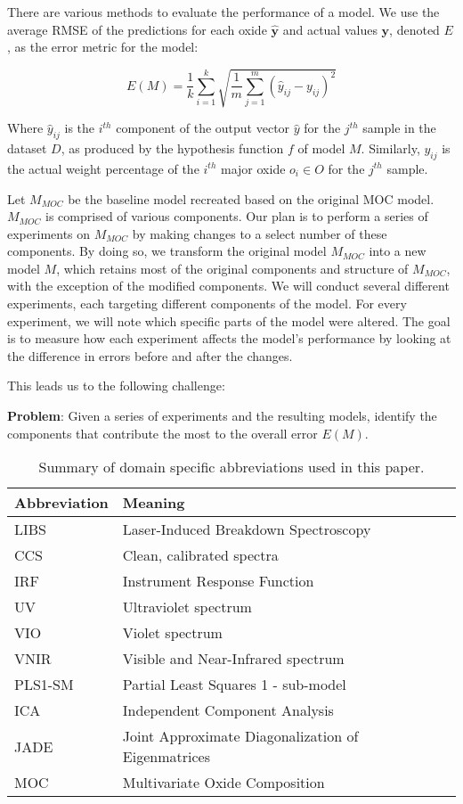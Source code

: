 There are various methods to evaluate the performance of a model.
We use the average RMSE of the predictions for each oxide $\mathbf{\hat{y}}$ and actual values $\mathbf{y}$, denoted $E$, as the error metric for the model:

\begin{equation}\label{eq:avg_rmse_metric}
    E(M) = \frac{1}{k} \sum_{i=1}^{k} \sqrt{\frac{1}{m} \sum_{j=1}^{m} (\hat{y}_{ij} - y_{ij})^2}
\end{equation}

Where \( \hat{y}_{ij} \) is the \( i^{th} \) component of the output vector \( \hat{y} \) for the \( j^{th} \) sample in the dataset \( D \), as produced by the hypothesis function \( f \) of model \( M \). Similarly, \( y_{ij} \) is the actual weight percentage of the \( i^{th} \) major oxide \( o_i \in O \) for the \( j^{th} \) sample.

Let $M_{MOC}$ be the baseline model recreated based on the original MOC model. $M_{MOC}$ is comprised of various components.
Our plan is to perform a series of experiments on $M_{MOC}$ by making changes to a select number of these components.
By doing so, we transform the original model $M_{MOC}$ into a new model $M$, which retains most of the original components and structure of $M_{MOC}$, with the exception of the modified components.
We will conduct several different experiments, each targeting different components of the model.
For every experiment, we will note which specific parts of the model were altered.
The goal is to measure how each experiment affects the model's performance by looking at the difference in errors before and after the changes.

This leads us to the following challenge:

\textbf{Problem}: Given a series of experiments and the resulting models, identify the components that contribute the most to the overall error $E(M)$.

\begin{table}
\centering
\begin{tabularx}{\columnwidth}{lX} %
\toprule
Abbreviation & Meaning \\
\midrule
LIBS & Laser-Induced Breakdown Spectroscopy \\
CCS & Clean, calibrated spectra \\
IRF & Instrument Response Function \\
UV & Ultraviolet spectrum \\
VIO & Violet spectrum \\
VNIR & Visible and Near-Infrared spectrum \\
PLS1-SM & Partial Least Squares 1 - sub-model \\
ICA & Independent Component Analysis \\
JADE & Joint Approximate Diagonalization of Eigenmatrices \\
MOC & Multivariate Oxide Composition \\
\bottomrule
\end{tabularx}
\caption{Summary of domain specific abbreviations used in this paper.}
\label{tab:abbreviations}
\end{table}